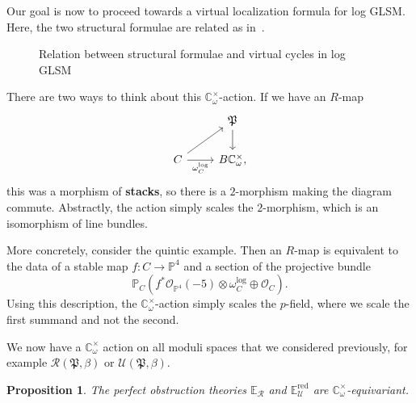 \documentclass[10pt,oldfontcommands,oneside]{memoir}
\newtheorem{prop}[thm]{Proposition}
\theoremstyle{definition}
\theoremstyle{remark}
\theoremstyle{plain}
\theoremstyle{definition}
\theoremstyle{remark}
\newcommand{\C}{\mathbb{C}}
\newcommand{\E}{\mathbb{E}}
\renewcommand{\P}{\mathbb{P}}
\newcommand{\mc}[1]{\mathcal{#1}}
\newcommand{\mf}[1]{\mathfrak{#1}}
\newcommand{\mr}[1]{\mathrm{#1}}
\newcommand{\1}{\mathbf{1}}
\newcommand{\2}{\mathbf{2}}
\newcommand{\3}{\mathbf{3}}
\newcommand{\vir}{\mr{vir}}
\newcommand{\red}{\mr{red}}
\begin{document}
Our goal is now to proceed towards a virtual localization formula for log GLSM. Here, the two structural formulae are related as in~.

\begin{figure}[htpb]
\begin{center}
\end{center}
\caption{Relation between structural formulae and virtual cycles in log GLSM}%
\label{fig:structural}
\end{figure}

There are two ways to think about this $\C_{\omega}^{\times}$-action. If we have an $R$-map
\begin{equation*}
\begin{tikzcd}
     & \mf{P} \ar{d} \\
    C \ar[swap]{r}{\omega_C^{\log}} \ar{ur} & B \C_{\omega}^{\times},
\end{tikzcd}
\end{equation*}
this was a morphism of \textbf{stacks}, so there is a $2$-morphism making the diagram commute. Abstractly, the action simply scales the $2$-morphism, which is an isomorphism of line bundles.

More concretely, consider the quintic example. Then an $R$-map is equivalent to the data of a stable map $f \colon C \to \P^4$ and a section of the projective bundle
\[ \P_C (f^* \mc{O}_{\P^4}(-5) \otimes \omega_C^{\log} \oplus \mc{O}_C). \]
Using this description, the $\C_{\omega}^{\times}$-action simply scales the $p$-field, where we scale the first summand and not the second.

We now have a $\C_{\omega}^{\times}$ action on all moduli spaces that we considered previously, for example $\mc{R}(\mf{P}, \beta)$ or $\mc{U}(\mf{P}, \beta)$.

\begin{prop}
    The perfect obstruction theories $\E_{\mc{R}}$ and $\E_{\mc{U}}^{\red}$ are $\C_{\omega}^{\times}$-equivariant.
\end{prop}
\end{document}
